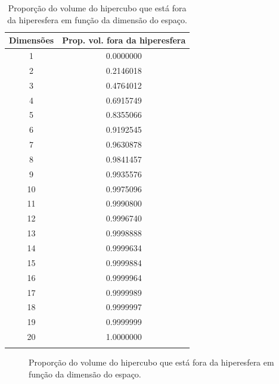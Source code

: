 \documentclass[
  a4paperpaper,
  DIV=11,
  numbers=noendperiod]{scrartcl}
\begin{document}
\begin{longtable}{cc}

\toprule
Dimensões & Prop. vol. fora da hiperesfera\\
\midrule
1 & 0.0000000\\
2 & 0.2146018\\
3 & 0.4764012\\
4 & 0.6915749\\
5 & 0.8355066\\
6 & 0.9192545\\
7 & 0.9630878\\
8 & 0.9841457\\
9 & 0.9935576\\
10 & 0.9975096\\
11 & 0.9990800\\
12 & 0.9996740\\
13 & 0.9998888\\
14 & 0.9999634\\
15 & 0.9999884\\
16 & 0.9999964\\
17 & 0.9999989\\
18 & 0.9999997\\
19 & 0.9999999\\
20 & 1.0000000\\
\bottomrule

\caption{\label{tbl-tabela-q2}Proporção do volume do hipercubo que está
fora da hiperesfera em função da dimensão do espaço.}

\tabularnewline

\end{longtable}

\begin{figure}[H]


\caption{\label{fig-grafico-q2}Proporção do volume do hipercubo que está
fora da hiperesfera em função da dimensão do espaço.}

\end{figure}%
\end{document}
